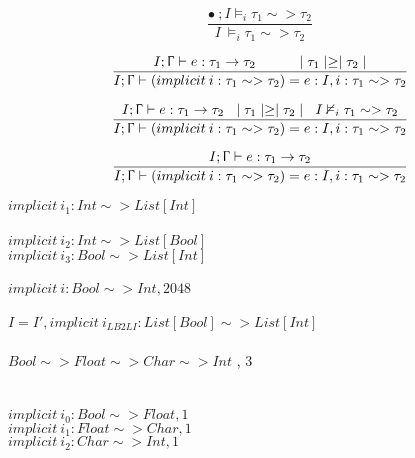 \documentclass{article}
\begin{document}
\[
  \frac{\bullet \: ;I \vDash_{i} \tau_{1} \sim > \tau_{2}}
  {I \: \vDash_{i} \tau_{1} \sim > \tau_{2}}
\]

\[
  \frac{I; \Upgamma \vdash e : \tau_{1} \rightarrow \tau_{2}\\
  \mid \tau_{1} \mid \geq \mid \tau_{2} \mid}
  {I; \Upgamma \vdash (implicit \: i : \tau_{1} \sim > \tau_{2}) = e : I, i : \tau_{1} \sim > \tau_{2}}
\]

\[
  \frac{I; \Upgamma \vdash e : \tau_{1} \rightarrow \tau_{2}\\
  \mid \tau_{1} \mid \geq \mid \tau_{2} \mid\\ I \nvDash_{i} \tau_{1} \sim > \tau_{2}}
  {I; \Upgamma \vdash (implicit \: i : \tau_{1} \sim > \tau_{2}) = e : I, i : \tau_{1} \sim > \tau_{2}}
\]

\[
  \frac{I; \Upgamma \vdash e : \tau_{1} \rightarrow \tau_{2}}
  {I; \Upgamma \vdash (implicit \: i : \tau_{1} \sim > \tau_{2}) = e : I, i : \tau_{1} \sim > \tau_{2}}
\]


$implicit \: i_{1}:Int \sim>List[Int]$
\\
\\
$implicit \: i_{2}:Int \sim>List[Bool]$
\\
$implicit \: i_{3}:Bool \sim>List[Int]$ \\ \\
$implicit \: i: Bool \sim>Int , 2048$\\ \\
$I=I',implicit \: i_{LB2LI}:List[Bool] \sim>List[Int]$ \\ \\
$Bool \sim>Float \sim>Char \sim> Int$ , 3\\ \\
\\
$implicit \: i_{0}:Bool \sim>Float, 1 $ \\
$implicit \: i_{1}:Float \sim>Char, 1 $ \\
$implicit \: i_{2}:Char \sim>Int, 1 $ \\
\\\\\\\\\\\\\\
\end{document}
